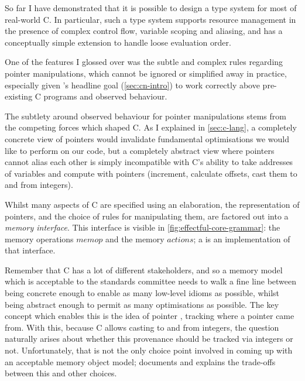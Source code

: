 So far I have demonstrated that it is possible to design a type system for most
of real-world C. In particular, such a type system supports resource management
in the presence of complex control flow, variable scoping and aliasing, and has
a conceptually simple extension to handle loose evaluation order.

One of the features I glossed over was the subtle and complex rules regarding
pointer manipulations, which cannot be ignored or simplified away in practice,
especially given 's headline goal (\cref{sec:cn-intro}) to work
correctly above pre-existing C programs and observed behaviour.

The subtlety around observed behaviour for pointer manipulations stems from the
competing forces which shaped C. As I
explained in \cref{sec:c-lang}, a completely concrete view of pointers would
invalidate fundamental optimisations we would like to perform on our code, but
a completely abstract view where pointers cannot alias each other is simply
incompatible with C's ability to take addresses of variables and compute with
pointers (increment, calculate offsets, cast them to and from integers).

Whilst many aspects of C are specified using an elaboration, the representation
of pointers, and the choice of rules for manipulating them, are factored out
into a \emph{memory interface}. This interface is visible in
\cref{fig:effectful-core-grammar}: the memory operations $\mathit{memop}$ and
the memory $\mathit{actions}$; a  is an
implementation of that interface.

Remember that C has a lot of different stakeholders, and so a memory model
which is acceptable to the standards committee needs to walk a fine line
between being concrete enough to enable as many low-level idioms as possible,
whilst being abstract enough to permit as many optimisations as possible. The
key concept which enables this is the idea of pointer ,
tracking where a pointer came from. With this, because C allows casting to and
from integers, the question naturally arises about whether this provenance
should be tracked via integers or not. Unfortunately, that is not the only
choice point involved in coming up with an acceptable memory object model;
 documents and explains the trade-offs
between this and other choices.

